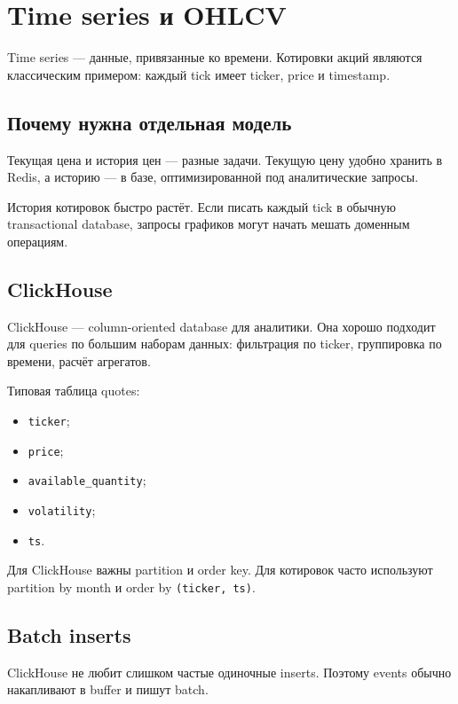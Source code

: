 \documentclass[12pt,a4paper]{article}
\begin{document}
\newpage
\section{Time series и OHLCV}

Time series --- данные, привязанные ко времени. Котировки акций являются
классическим примером: каждый tick имеет ticker, price и timestamp.

\subsection{Почему нужна отдельная модель}

Текущая цена и история цен --- разные задачи. Текущую цену удобно хранить в Redis,
а историю --- в базе, оптимизированной под аналитические запросы.

История котировок быстро растёт. Если писать каждый tick в обычную transactional
database, запросы графиков могут начать мешать доменным операциям.

\subsection{ClickHouse}

ClickHouse --- column-oriented database для аналитики. Она хорошо подходит для
queries по большим наборам данных: фильтрация по ticker, группировка по времени,
расчёт агрегатов.

Типовая таблица quotes:
\begin{itemize}
    \item \texttt{ticker};
    \item \texttt{price};
    \item \texttt{available\_quantity};
    \item \texttt{volatility};
    \item \texttt{ts}.
\end{itemize}

Для ClickHouse важны partition и order key. Для котировок часто используют
partition by month и order by \texttt{(ticker, ts)}.

\subsection{Batch inserts}

ClickHouse не любит слишком частые одиночные inserts. Поэтому events обычно
накапливают в buffer и пишут batch.
\end{document}
